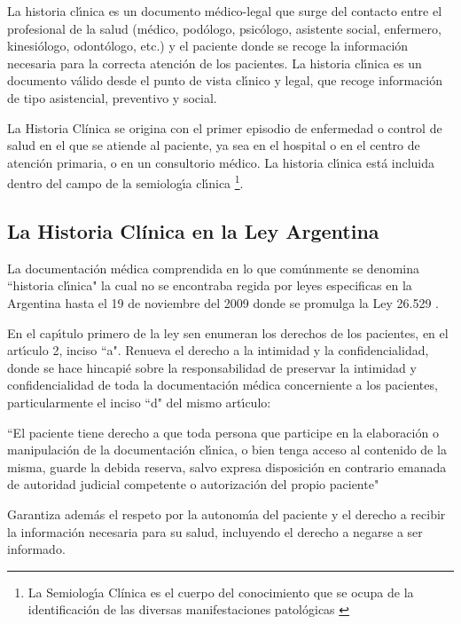 La historia cl\'{\i}nica es un documento m\'edico-legal que surge del contacto entre el 
profesional de la salud (m\'edico, pod\'ologo, psic\'ologo, asistente social, enfermero, 
kinesi\'ologo, odont\'ologo, etc.) y el paciente donde se recoge la informaci\'on necesaria 
para la correcta atenci\'on de los pacientes. La historia cl\'{\i}nica es un documento 
v\'alido desde el punto de vista cl\'{\i}nico y legal, que recoge informaci\'on de tipo 
asistencial, preventivo y social.

La Historia Clínica se origina con el primer episodio de enfermedad o control de salud en 
el que se atiende al paciente, ya sea en el hospital o en el centro de atenci\'on primaria, 
o en un consultorio m\'edico. La historia cl\'{\i}nica est\'a incluida dentro del campo de la 
semiolog\'{\i}a cl\'{\i}nica \footnote{La Semiolog\'{\i}a Clínica es el cuerpo del conocimiento
que se ocupa de la identificación de las diversas manifestaciones patológicas 
\cite{SemiClin}}.

\subsection{La Historia Clínica en la Ley Argentina}

La documentaci\'on m\'edica comprendida en lo que com\'unmente se denomina ``historia 
cl\'{\i}nica" la cual no se encontraba regida por leyes especificas en la Argentina hasta
el 19 de noviembre del 2009 donde se promulga la Ley 26.529 \cite{LeyHC}.

En el cap\'{\i}tulo primero de la ley sen enumeran los derechos de los pacientes, 
en el art\'{\i}culo 2, inciso ``a". Renueva el derecho a la intimidad y la confidencialidad, 
donde se hace hincapi\'e sobre la responsabilidad de preservar la intimidad y 
confidencialidad de toda la documentaci\'on m\'edica concerniente a los pacientes, 
particularmente el inciso ``d" del mismo art\'{\i}culo:

``El paciente tiene derecho a que toda persona que participe en la elaboraci\'on 
o manipulaci\'on de la documentaci\'on cl\'{\i}nica, o bien tenga acceso al contenido de 
la misma, guarde la debida reserva, salvo expresa disposici\'on en contrario 
emanada de autoridad judicial competente o autorizaci\'on del propio paciente"

Garantiza adem\'as el respeto por la autonom\'{\i}a del paciente y el derecho a recibir 
la informaci\'on necesaria para su salud, incluyendo el derecho a negarse a ser 
informado.

